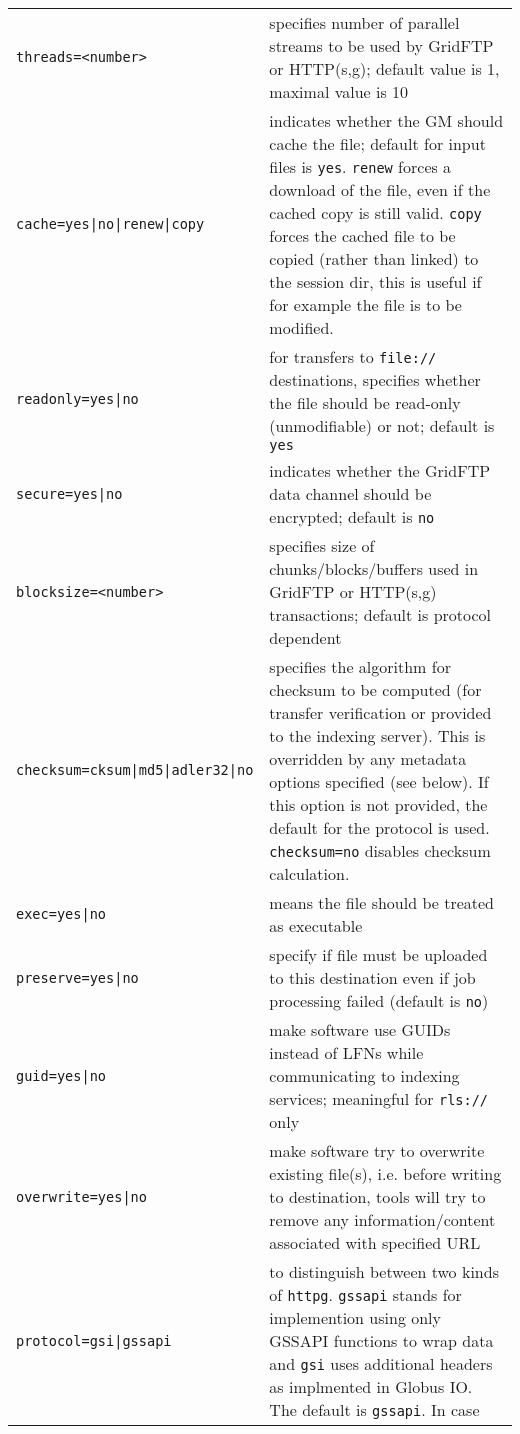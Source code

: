 \begin{longtable}{lp{10cm}}
   \verb#threads=<number># & specifies number of parallel
   streams to be used by GridFTP or HTTP(s,g); default value is 1,
   maximal value is 10\\
   \verb#cache=yes|no|renew|copy# & indicates whether the GM should
   cache the file; default for input files is \verb#yes#. \verb#renew#
   forces a download of the file, even if the cached copy is still valid.
   \verb#copy# forces the cached file to be copied (rather than linked) to
   the session dir, this is useful if for example the file is to be modified.\\
   \verb#readonly=yes|no# & for transfers to \verb#file://# destinations,
   specifies whether the file should be
   read-only (unmodifiable) or not; default is \verb#yes# \\
   \verb#secure=yes|no# & indicates whether the GridFTP data
   channel should be encrypted; default is \verb#no#\\
   \verb#blocksize=<number># & specifies size of
   chunks/blocks/buffers used in GridFTP or HTTP(s,g) transactions;
   default is protocol dependent\\
   \verb#checksum=cksum|md5|adler32|no# & specifies the algorithm for checksum to be
   computed (for transfer verification or provided to the indexing server). This is overridden
   by any metadata options specified (see below). If this option is
   not provided, the default for the protocol is used. \verb#checksum=no#
   disables checksum calculation.\\
   \verb#exec=yes|no# & means the file should be treated as executable\\
   \verb#preserve=yes|no# & specify if file must be uploaded to this
   destination even if job processing failed (default is \verb#no#)\\
   \verb#guid=yes|no# & make software use GUIDs instead of LFNs while
   communicating to indexing services; meaningful for \verb#rls://#
   only\\
   \verb#overwrite=yes|no# & make software try to overwrite existing
   file(s), i.e. before writing to destination, tools will try to remove
   any information/content associated with specified URL\\
   \verb#protocol=gsi|gssapi# & to distinguish between two kinds of 
   \verb#httpg#. \verb#gssapi# stands for implemention using only GSSAPI 
   functions to wrap data and \verb#gsi# uses additional headers as 
   implmented in Globus IO. The default is \verb#gssapi#. In case

\end{longtable}
